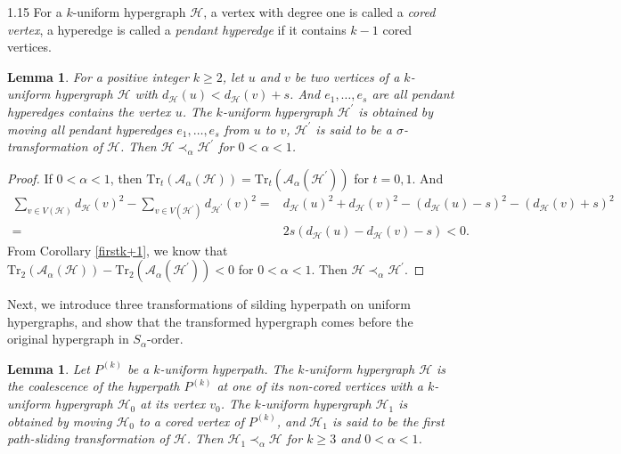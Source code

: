 \documentclass[preprint,12pt]{elsarticle1}
\newtheorem{lem}[thm]{Lemma}
\numberwithin{equation}{section}
\begin{document}
\begin{spacing}{1.15}
For a $k$-uniform hypergraph $\mathcal{H}$, a vertex with degree one is called a \textit{cored vertex}, a hyperedge is called a \textit{pendant hyperedge} if it contains $k-1$ cored vertices.

\begin{lem}\label{1}
For a positive integer $k\ge2$, let $u$ and $v$ be two vertices of a $k$-uniform hypergraph $\mathcal{H}$ with $d_{\mathcal{H}}(u)<d_{\mathcal{H}}(v)+s$.
And $e_1,\ldots,e_s$ are all pendant hyperedges contains the vertex $u$.
The $k$-uniform hypergraph $\mathcal{H}^{'}$ is obtained by moving all pendant hyperedges $e_1,\ldots,e_s$ from $u$ to $v$, $\mathcal{H}^{'}$ is said to be a \textit{$\sigma$-transformation} of $\mathcal{H}$.
Then $\mathcal{H}\prec_{\alpha}\mathcal{H}^{'}$ for $0<\alpha<1$.
\end{lem}

\begin{proof}
If $0<\alpha<1$, then $\mathrm{Tr}_{t}(\mathcal{A}_{\alpha}(\mathcal{H}))=\mathrm{Tr}_{t}(\mathcal{A}_{\alpha}(\mathcal{H}^{'}))$ for $t=0,1$.
And
\begin{align*}
\sum_{v\in V(\mathcal{H})}d_{\mathcal{H}}(v)^2-\sum_{v\in V(\mathcal{H}^{'})}d_{\mathcal{H}^{'}}(v)^2
=&d_{\mathcal{H}}(u)^2+d_{\mathcal{H}}(v)^2-(d_{\mathcal{H}}(u)-s)^2-(d_{\mathcal{H}}(v)+s)^2\\
=&2s(d_{\mathcal{H}}(u)-d_{\mathcal{H}}(v)-s)<0.
\end{align*}
From Corollary \ref{firstk+1}, we know that $\mathrm{Tr}_{2}(\mathcal{A}_{\alpha}(\mathcal{H}))-\mathrm{Tr}_{2}(\mathcal{A}_{\alpha}(\mathcal{H}^{'}))<0$ for $0<\alpha<1$.
Then $\mathcal{H}\prec_{\alpha}\mathcal{H}^{'}$.
\end{proof}

Next, we introduce three transformations of silding hyperpath on uniform hypergraphs, and show that the transformed hypergraph comes before the original hypergraph in $S_{\alpha}$-order.

\begin{lem}\label{3}
Let $P^{(k)}$ be a $k$-uniform hyperpath.
The $k$-uniform hypergraph $\mathcal{H}$ is the coalescence of the hyperpath $P^{(k)}$ at one of its non-cored vertices with a $k$-uniform hypergraph $\mathcal{H}_0$ at its vertex $v_0$.
The $k$-uniform hypergraph $\mathcal{H}_{1}$ is obtained by moving $\mathcal{H}_0$ to a cored vertex of $P^{(k)}$, and $\mathcal{H}_1$ is said to be \textit{the first path-sliding transformation} of $\mathcal{H}$.
Then $\mathcal{H}_1\prec_{\alpha}\mathcal{H}$ for $k\ge3$ and $0<\alpha<1$.
\end{lem}


\end{spacing}
\end{document}
